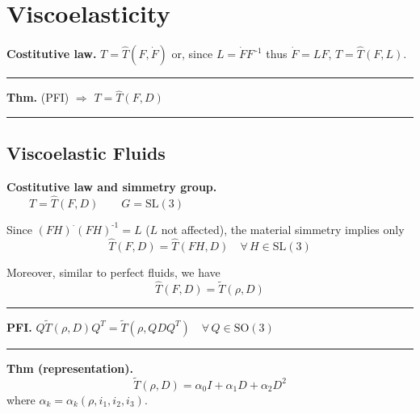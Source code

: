

\section{\texorpdfstring{\color{red}Viscoelasticity}{}}


\textbf{Costitutive law.} $T=\hat{T}(F,\dot{F})$ or, since $L=\dot{F}F^{\,\text{-}1}$ thus $\dot{F}=LF$, $T=\hat{T}(F,L)$.

\rule{0.31\textwidth}{0.2pt}
\smallskip

\textbf{Thm.} (PFI) $\Longrightarrow$ $T=\hat{T}(F,D)$

\rule{0.31\textwidth}{0.2pt}


\subsection{\texorpdfstring{\color{red}Viscoelastic Fluids}{}}


\textbf{Costitutive law and simmetry group.} \\
$\qquad T=\hat{T}(F,D)\qquad G=\text{SL}(3)$

Since $(FH)^\cdot(FH)^{\text{-}1}=L$ ($L$ not affected), the material simmetry implies only
\begin{equation*}
\hat{T}(F,D)=\hat{T}(FH,D)\quad\forall\,H\in\text{SL}(3)
\end{equation*}

Moreover, similar to perfect fluids, we have
\begin{equation*}
\boxed{\hat{T}(F,D)=\widetilde{T}(\rho,D)}
\end{equation*}

\rule{0.31\textwidth}{0.2pt}
\smallskip

\textbf{PFI.} $Q\widetilde{T}(\rho,D)Q^T=\widetilde{T}(\rho,QDQ^T)\quad\forall\,Q\in\text{SO}(3)$

\rule{0.31\textwidth}{0.2pt}
\smallskip

\textbf{Thm (representation).}
\begin{equation*}
\boxed{\widetilde{T}(\rho,D)=\alpha_0 I+\alpha_1D+\alpha_2D^2}
\end{equation*} 
where $\alpha_k=\alpha_k(\rho,i_1,i_2,i_3)$.

